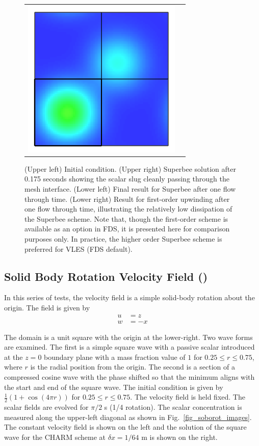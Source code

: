 \documentclass[11pt]{book}
\begin{document}
\begin{figure}[p]
\begin{tabular}{rl}
      \includegraphics[width=3in]{SCRIPT_FIGURES/move_slug_FL1_tf} \\
   \end{tabular}
   \caption[Multi-mesh square wave transport]{(Upper left) Initial condition. (Upper right) Superbee solution after 0.175 seconds showing the scalar slug cleanly passing through the mesh interface. (Lower left) Final result for Superbee after one flow through time.  (Lower right) Result for first-order upwinding after one flow through time, illustrating the relatively low dissipation of the Superbee scheme.  Note that, though the first-order scheme is available as an option in FDS, it is presented here for comparison purposes only.  In practice, the higher order Superbee scheme is preferred for VLES (FDS default).}
   \label{fig_move_slug}
\end{figure}

\newpage

\clearpage

\subsection{Solid Body Rotation Velocity Field (\texorpdfstring{}{soborot})}
\label{sec:soborot_error}

In this series of tests, the velocity field is a simple solid-body rotation about the origin.  The field is given by
\begin{align}
u &= z \\
w & = -x
\end{align}

The domain is a unit square with the origin at the lower-right.  Two wave forms are examined.  The first is a simple square wave with a passive scalar introduced at the $z=0$ boundary plane with a mass fraction value of $1$ for $0.25 \le r \le 0.75$, where $r$ is the radial position from the origin.  The second is a section of a compressed cosine wave with the phase shifted so that the minimum aligns with the start and end of the square wave.  The initial condition is given by $\frac{1}{2}(1 + \cos(4\pi r))$ for $0.25 \le r \le 0.75$.  The velocity field is held fixed.  The scalar fields are evolved for $\pi/2$ s (1/4 rotation).  The scalar concentration is measured along the upper-left diagonal as shown in Fig.~\ref{fig_soborot_images}.  The constant velocity field is shown on the left and the solution of the square wave for the CHARM scheme at $\delta x = 1/64$ m is shown on the right.
\end{document}
